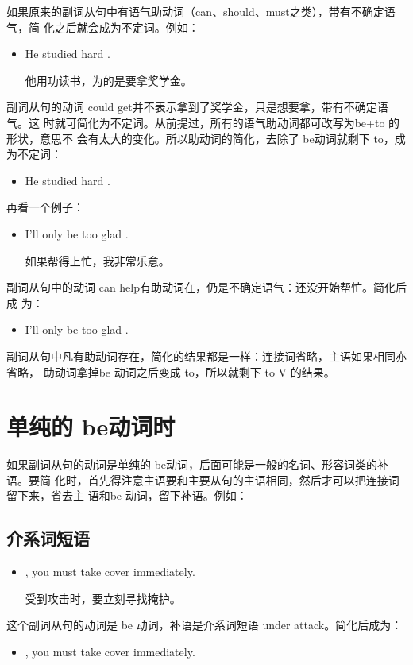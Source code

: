 如果原来的副词从句中有语气助动词（can、should、must之类），带有不确定语气，简
化之后就会成为不定词。例如：
\begin{itemize}
\item He studied hard .

  他用功读书，为的是要拿奖学金。
\end{itemize}
副词从句的动词 could get并不表示拿到了奖学金，只是想要拿，带有不确定语气。这
时就可简化为不定词。从前提过，所有的语气助动词都可改写为be+to 的形状，意思不
会有太大的变化。所以助动词的简化，去除了 be动词就剩下 to，成为不定词：
\begin{itemize}
\item He studied hard .
\end{itemize}

再看一个例子：
\begin{itemize}
\item I'll only be too glad .

  如果帮得上忙，我非常乐意。
\end{itemize}
副词从句中的动词 can help有助动词在，仍是不确定语气：还没开始帮忙。简化后成
为：
\begin{itemize}
\item   I'll only be too glad .
\end{itemize}

副词从句中凡有助动词存在，简化的结果都是一样：连接词省略，主语如果相同亦省略，
助动词拿掉be 动词之后变成 to，所以就剩下 to V 的结果。

\section{单纯的 be动词时}

如果副词从句的动词是单纯的 be动词，后面可能是一般的名词、形容词类的补语。要简
化时，首先得注意主语要和主要从句的主语相同，然后才可以把连接词留下来，省去主
语和be 动词，留下补语。例如：

\subsection{介系词短语}

\begin{itemize}
\item {}, you must take cover immediately.

  受到攻击时，要立刻寻找掩护。
\end{itemize}
这个副词从句的动词是 be 动词，补语是介系词短语 under attack。简化后成为：
\begin{itemize}
\item {}, you must take cover immediately.
\end{itemize}

